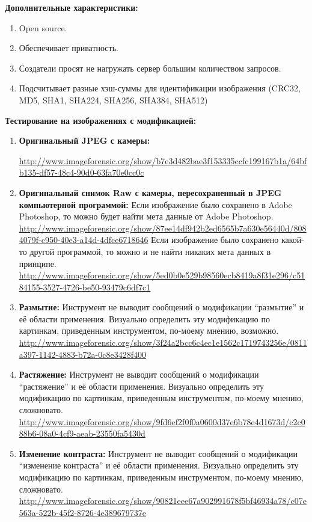\textbf{Дополнительные характеристики:}
\begin{enumerate}
  \item Open source.
  \item Обеспечивает приватность.
  \item Создатели просят не нагружать сервер большим количеством запросов.
  \item Подсчитывает разные хэш-суммы для идентификации изображения (CRC32, MD5, SHA1, SHA224, SHA256, SHA384, SHA512)
\end{enumerate}

\textbf{Тестирование на изображениях с модификацией:}
\begin{enumerate}
\item \textbf{Оригинальный JPEG с камеры:}

\url{http://www.imageforensic.org/show/b7e3d482bae3f153335ccfc199167b1a/64bfb135-df57-48c4-90d0-63fa70e0cc0c}

\item \textbf{Оригинальный снимок Raw с камеры, пересохраненный в JPEG компьютерной программой:}
Если изображение было сохранено в Adobe Photoshop, то можно будет найти мета данные от Adobe Photoshop.
\url{http://www.imageforensic.org/show/87ee14df942b2ed6565b7a630e56440d/8084079f-c950-40e3-a14d-4dfce6718646}
Если изображение было сохранено какой-то другой программой, то можно и не найти никаких мета данных в принципе.
\url{http://www.imageforensic.org/show/5ed0b0e529b98560ecb8419a8f31e296/c5184155-3527-4726-be50-93479c6df7c1}

\item \textbf{Размытие:}
Инструмент не выводит сообщений о модификации “размытие” и её области применения. Визуально определить эту модификацию по картинкам, приведенным инструментом, по-моему мнению, возможно.
\url{http://www.imageforensic.org/show/3f24a2bcc6c4ec1e1562c1719743256e/0811a397-1142-4883-b72a-0c8e3428f400}

\item \textbf{Растяжение:}
Инструмент не выводит сообщений о модификации “растяжение” и её области применения. Визуально определить эту модификацию по картинкам, приведенным инструментом, по-моему мнению, сложновато.
\url{http://www.imageforensic.org/show/9fd6ef2f0f0a0600d37e6b78e4d1673d/c2c088b6-08a0-4cf9-aeab-23550fa5430d}

\item \textbf{Изменение контраста:}
Инструмент не выводит сообщений о модификации “изменение контраста” и её области применения. Визуально определить эту модификацию по картинкам, приведенным инструментом, по-моему мнению, сложновато.
\url{http://www.imageforensic.org/show/90821eee67a902991678f5bf46934a78/c07e563a-522b-45f2-8726-4e389679737e}


\end{enumerate}
